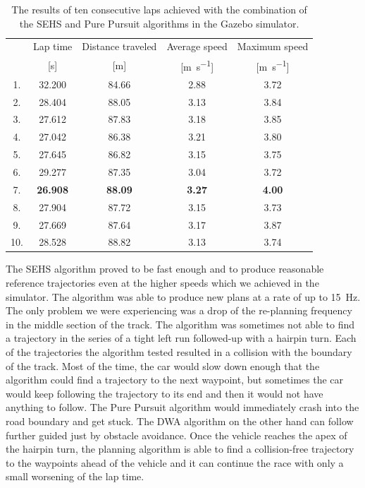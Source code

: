 \begin{table}
	\centering
	\label{tbl:pure-pursuit}
	\begin{tabular}{c c c c c}
		\toprule
		& Lap time       & Distance traveled  & Average speed             & Maximum speed             \\
		& [\si{\second}] & [\si{\meter}]      & [\si{\meter\per\second}]  & [\si{\meter\per\second}]  \\
		\midrule
		1.  & 32.200 & 84.66 & 2.88 & 3.72 \\
		2.  & 28.404 & 88.05 & 3.13 & 3.84 \\
		3.  & 27.612 & 87.83 & 3.18 & 3.85 \\
		4.  & 27.042 & 86.38 & 3.21 & 3.80 \\
		5.  & 27.645 & 86.82 & 3.15 & 3.75 \\
		6.  & 29.277 & 87.35 & 3.04 & 3.72 \\
		7.  & \textbf{26.908} & \textbf{88.09} & \textbf{3.27} & \textbf{4.00} \\
		8.  & 27.904 & 87.72 & 3.15 & 3.73 \\
		9.  & 27.669 & 87.64 & 3.17 & 3.87 \\
		10. & 28.528 & 88.82 & 3.13 & 3.74 \\

		\bottomrule
	\end{tabular}
	\caption{The results of ten consecutive laps achieved with the combination of the SEHS and Pure Pursuit algorithms in the Gazebo simulator.}
\end{table}



The \gls{SEHS} algorithm proved to be fast enough and to produce reasonable reference trajectories even at the higher speeds which we achieved in the simulator. The algorithm was able to produce new plans at a rate of up to \SI{15}{\hertz}. The only problem we were experiencing was a drop of the re-planning frequency in the middle section of the track. The algorithm was sometimes not able to find a trajectory in the series of a tight left run followed-up with a hairpin turn. Each of the trajectories the algorithm tested resulted in a collision with the boundary of the track. Most of the time, the car would slow down enough that the algorithm could find a trajectory to the next waypoint, but sometimes the car would keep following the trajectory to its end and then it would not have anything to follow. The Pure Pursuit algorithm would immediately crash into the road boundary and get stuck. The \gls*{DWA} algorithm on the other hand can follow further guided just by obstacle avoidance. Once the vehicle reaches the apex of the hairpin turn, the planning algorithm is able to find a collision-free trajectory to the waypoints ahead of the vehicle and it can continue the race with only a small worsening of the lap time.

